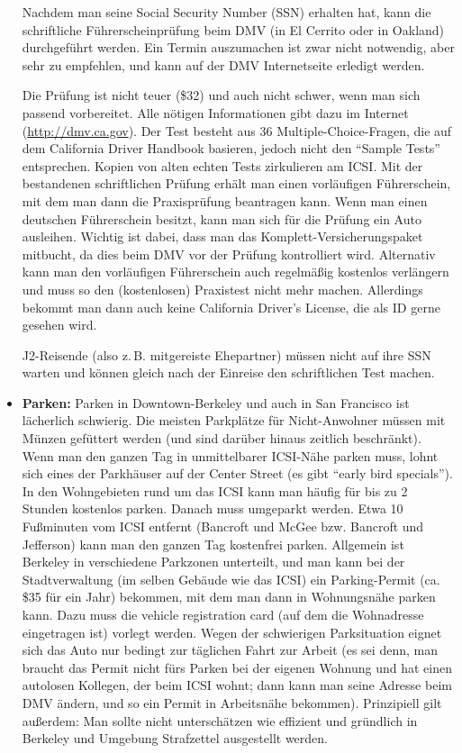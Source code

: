 \documentclass[a4paper]{scrreprt}
\begin{document}
\begin{itemize}
Nachdem man seine Social Security Number (SSN) erhalten hat, kann die schriftliche Führerscheinprüfung beim DMV (in El Cerrito oder in Oakland) durchgeführt werden.
Ein Termin auszumachen ist zwar nicht notwendig, aber sehr zu empfehlen, und kann auf der DMV Internetseite erledigt werden. 

Die Prüfung ist nicht teuer (\$32) und auch nicht schwer, wenn man sich passend vorbereitet. Alle nötigen Informationen gibt dazu im Internet (\url{http://dmv.ca.gov}). Der Test besteht aus 36 Multiple-Choice-Fragen, die auf dem California Driver Handbook basieren, jedoch nicht den ``Sample Tests'' entsprechen. Kopien von alten echten Tests zirkulieren am ICSI.  Mit der bestandenen schriftlichen Prüfung erhält man einen vorläufigen Führerschein, mit dem man dann die Praxisprüfung beantragen kann. Wenn man einen deutschen Führerschein besitzt, kann man sich für die Prüfung ein Auto ausleihen. Wichtig ist dabei, dass man das Komplett-Versicherungspaket mitbucht, da dies beim DMV vor der Prüfung kontrolliert wird. Alternativ kann man den vorläufigen Führerschein auch regelmäßig kostenlos verlängern und muss so den (kostenlosen) Praxistest nicht mehr machen. Allerdings bekommt man dann auch keine California Driver's License, die als ID gerne gesehen wird.

J2-Reisende (also z.\,B. mitgereiste Ehepartner) müssen nicht auf ihre SSN warten und können gleich nach der Einreise den schriftlichen Test machen.

	\item \textbf{Parken:} Parken in Downtown-Berkeley und auch in San Francisco ist lächerlich schwierig. Die meisten Parkplätze für Nicht-Anwohner müssen mit Münzen gefüttert werden (und sind darüber hinaus zeitlich beschränkt). Wenn man den ganzen Tag in unmittelbarer ICSI-Nähe parken muss, lohnt sich eines der Parkhäuser auf der Center Street (es gibt ``early bird specials''). In den Wohngebieten rund um das ICSI kann man häufig für bis zu 2 Stunden kostenlos parken. Danach muss umgeparkt werden. Etwa 10 Fußminuten vom ICSI entfernt (Bancroft und McGee bzw. Bancroft und Jefferson) kann man den ganzen Tag kostenfrei parken. Allgemein ist Berkeley in verschiedene Parkzonen unterteilt, und man kann bei der Stadtverwaltung (im selben Gebäude wie das ICSI) ein Parking-Permit (ca. \$35 für ein Jahr) bekommen, mit dem man dann in Wohnungsnähe parken kann. Dazu muss die vehicle registration card (auf dem die Wohnadresse eingetragen ist) vorlegt werden. Wegen der schwierigen Parksituation eignet sich das Auto nur bedingt zur täglichen Fahrt zur Arbeit (es sei denn, man braucht das Permit nicht fürs Parken bei der eigenen Wohnung und hat einen autolosen Kollegen, der beim ICSI wohnt; dann kann man seine Adresse beim DMV ändern, und so ein Permit in Arbeitsnähe bekommen). Prinzipiell gilt außerdem: Man sollte nicht unterschätzen wie effizient und gründlich in Berkeley und Umgebung Strafzettel ausgestellt werden. 


\end{itemize}
\end{document}
